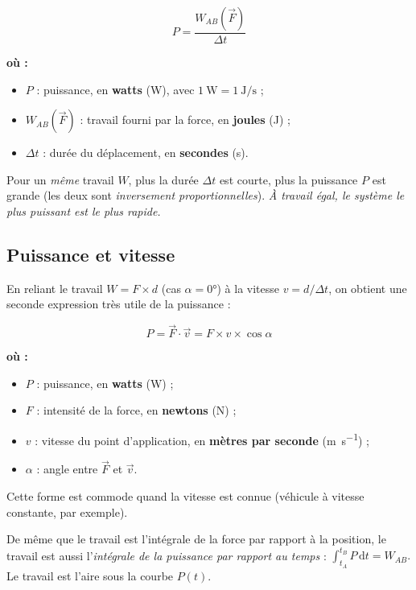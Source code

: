 \documentclass[11pt,a4paper]{article}
\newenvironment{ou}{%
  \par\smallskip\noindent\textbf{où :}\nopagebreak
  \begin{itemize}[leftmargin=1.8em,topsep=2pt,itemsep=1.5pt,parsep=0pt]}%
  {\end{itemize}}
\newcommand{\vv}[1]{\vec{#1}}
\newcommand{\dd}{\mathrm{d}}
\begin{document}
\begin{formule}
\[
\boxed{\;P=\dfrac{W_{AB}(\vv F)}{\Delta t}\;}
\]
\begin{ou}
  \item $P$ : puissance, en \textbf{watts} (\si{\watt}), avec \(\SI{1}{\watt}=\SI{1}{\joule\per\second}\) ;
  \item $W_{AB}(\vv F)$ : travail fourni par la force, en \textbf{joules} (\si{\joule}) ;
  \item $\Delta t$ : durée du déplacement, en \textbf{secondes} (\si{\second}).
\end{ou}
\end{formule}

\begin{remarque}
Pour un \emph{même} travail $W$, plus la durée $\Delta t$ est courte, plus la puissance $P$ est
grande (les deux sont \emph{inversement proportionnelles}). \emph{À travail égal, le système le plus
puissant est le plus rapide.}
\end{remarque}

\subsection{Puissance et vitesse}

En reliant le travail $W=F\times d$ (cas $\alpha=\ang{0}$) à la vitesse $v=d/\Delta t$, on obtient
une seconde expression très utile de la puissance :

\begin{formule}
\[
\boxed{\;P=\vv F\cdot\vv v=F\times v\times\cos\alpha\;}
\]
\begin{ou}
  \item $P$ : puissance, en \textbf{watts} (\si{\watt}) ;
  \item $F$ : intensité de la force, en \textbf{newtons} (\si{\newton}) ;
  \item $v$ : vitesse du point d'application, en \textbf{mètres par seconde} (\si{\metre\per\second}) ;
  \item $\alpha$ : angle entre $\vv F$ et $\vv v$.
\end{ou}
Cette forme est commode quand la vitesse est connue (véhicule à vitesse constante, par exemple).
\end{formule}

\begin{remarque}
De même que le travail est l'intégrale de la force par rapport à la position, le travail est aussi
l'\emph{intégrale de la puissance par rapport au temps} : \(\displaystyle\int_{t_A}^{t_B} P\,\dd t=W_{AB}.\)
Le travail est l'aire sous la courbe $P(t)$.
\end{remarque}
\end{document}
